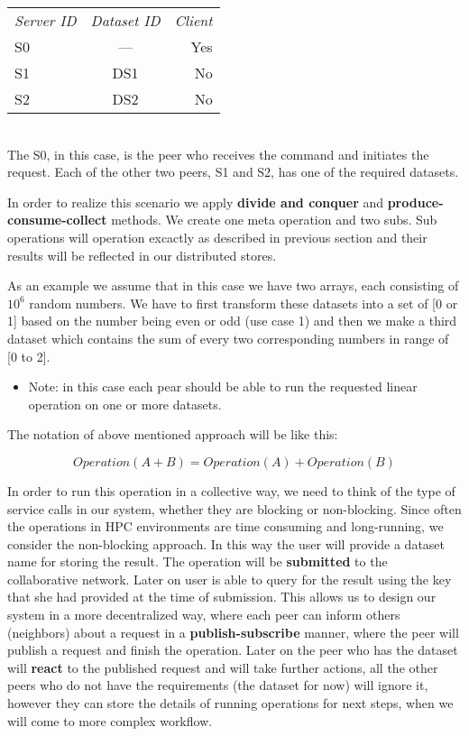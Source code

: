 \begin{tabular}{ l c r }
\em{Server ID} & \em{ Dataset ID} & \em{ Client} \\
S0 & --- & Yes \\
S1 & DS1 & No \\
S2 & DS2 & No \\
\end{tabular}\\

The S0, in this case, is the peer who receives the command and initiates the request. 
Each of the other two peers, S1 and S2, has one of the required datasets. 

In order to realize this scenario we apply \textbf{divide and conquer} and \textbf{produce-consume-collect} methods.
We create one meta operation and two subs. Sub operations will operation excactly as described in previous section
and their results will be reflected in our distributed stores.

As an example we assume that in this case we have two arrays, each consisting of \(10^6\) random numbers. 
We have to first transform these datasets into a set of [0 or 1] based on the number being even or odd (use case 1) 
and then we make a third dataset which contains the sum of every two corresponding numbers in range of [0 to 2].

\begin{itemize}
\item Note: in this case each pear should be able to run the requested linear operation on one or more datasets.
\end{itemize}

The notation of above mentioned approach will be like this:

\[ Operation(A + B) = Operation(A) + Operation(B) \]

In order to run this operation in a collective way, 
we need to think of the type of service calls in our system, 
whether they are blocking or non-blocking. 
Since often the operations in HPC environments are time consuming and long-running, 
we consider the non-blocking approach. 
In this way the user will provide a dataset name for storing the result. 
The operation will be \textbf{submitted} to the collaborative network.
Later on user is able to query for the result using the key that she had provided at the time of submission. 
This allows us to design our system in a more decentralized way, 
where each peer can inform others (neighbors) about a request in a \textbf{publish-subscribe} manner, 
where the peer will publish a request and finish the operation. 
Later on the peer who has the dataset will \textbf{react} to the published request 
and will take further actions, 
all the other peers who do not have the requirements (the dataset for now) will ignore it, 
however they can store the details of running operations for next steps, when we will come to more complex workflow.

